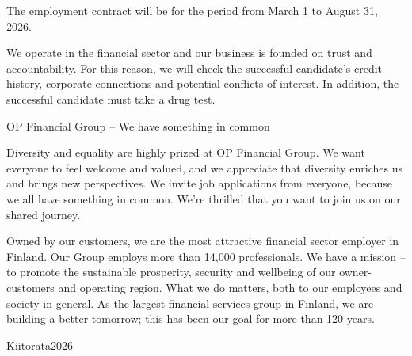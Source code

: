 \documentclass[a4paper,11pt]{article}
\begin{document}
The employment contract will be for the period from March 1 to August 31, 2026.

We operate in the financial sector and our business is founded on trust and accountability. For this reason, we will check the successful candidate's credit history, corporate connections and potential conflicts of interest. In addition, the successful candidate must take a drug test.

OP Financial Group – We have something in common

Diversity and equality are highly prized at OP Financial Group. We want everyone to feel welcome and valued, and we appreciate that diversity enriches us and brings new perspectives. We invite job applications from everyone, because we all have something in common. We're thrilled that you want to join us on our shared journey.

Owned by our customers, we are the most attractive financial sector employer in Finland. Our Group employs more than 14,000 professionals. We have a mission – to promote the sustainable prosperity, security and wellbeing of our owner-customers and operating region. What we do matters, both to our employees and society in general. As the largest financial services group in Finland, we are building a better tomorrow; this has been our goal for more than 120 years.

Kiitorata2026
\end{document}
